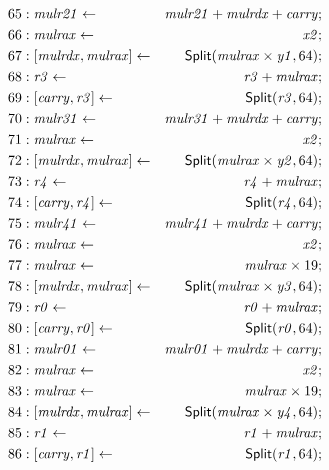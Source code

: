 {\begin{multicols}{2}
\begin{align*}
65 &: \mathit{mulr21} \leftarrow & \mathit{mulr21} + \mathit{mulrdx} + \mathit{carry}; \\
66 &: \mathit{mulrax} \leftarrow & \mathit{x2}; \\
67 &: \concat{\mathit{mulrdx}}{\mathit{mulrax}} \leftarrow & \dslcode{Split}(\mathit{mulrax} \times \mathit{y1}, 64); \\
68 &: \mathit{r3} \leftarrow & \mathit{r3} + \mathit{mulrax}; \\
69 &: \concat{\mathit{carry}}{\mathit{r3}} \leftarrow & \dslcode{Split}(\mathit{r3}, 64); \\
70 &: \mathit{mulr31} \leftarrow & \mathit{mulr31} + \mathit{mulrdx} + \mathit{carry}; \\
71 &: \mathit{mulrax} \leftarrow & \mathit{x2}; \\
72 &: \concat{\mathit{mulrdx}}{\mathit{mulrax}} \leftarrow & \dslcode{Split}(\mathit{mulrax} \times \mathit{y2}, 64); \\
73 &: \mathit{r4} \leftarrow & \mathit{r4} + \mathit{mulrax}; \\
74 &: \concat{\mathit{carry}}{\mathit{r4}} \leftarrow & \dslcode{Split}(\mathit{r4}, 64); \\
75 &: \mathit{mulr41} \leftarrow & \mathit{mulr41} + \mathit{mulrdx} + \mathit{carry}; \\
76 &: \mathit{mulrax} \leftarrow & \mathit{x2}; \\
77 &: \mathit{mulrax} \leftarrow & \mathit{mulrax} \times 19; \\
78 &: \concat{\mathit{mulrdx}}{\mathit{mulrax}} \leftarrow & \dslcode{Split}(\mathit{mulrax} \times \mathit{y3}, 64); \\
79 &: \mathit{r0} \leftarrow & \mathit{r0} + \mathit{mulrax}; \\
80 &: \concat{\mathit{carry}}{\mathit{r0}} \leftarrow & \dslcode{Split}(\mathit{r0}, 64); \\
81 &: \mathit{mulr01} \leftarrow & \mathit{mulr01} + \mathit{mulrdx} + \mathit{carry}; \\
82 &: \mathit{mulrax} \leftarrow & \mathit{x2}; \\
83 &: \mathit{mulrax} \leftarrow & \mathit{mulrax} \times 19; \\
84 &: \concat{\mathit{mulrdx}}{\mathit{mulrax}} \leftarrow & \dslcode{Split}(\mathit{mulrax} \times \mathit{y4}, 64); \\
85 &: \mathit{r1} \leftarrow & \mathit{r1} + \mathit{mulrax}; \\
86 &: \concat{\mathit{carry}}{\mathit{r1}} \leftarrow & \dslcode{Split}(\mathit{r1}, 64); \\

\end{align*}
\end{multicols}}
